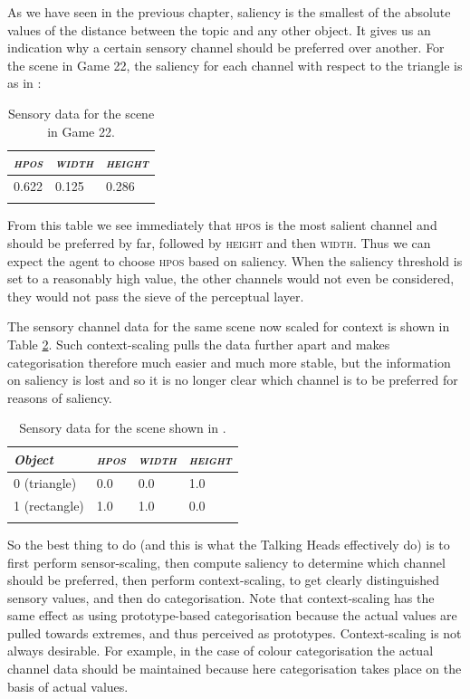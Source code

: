 As we have seen in the previous chapter, 
saliency is the smallest of the absolute values     
of the distance between the topic and any
other object. It gives us an indication why 
a certain sensory channel should be preferred
over another. For the scene in Game 22, the saliency for each channel with 
respect to the triangle is as in : 

\begin{table}
\begin{center}
\begin{tabular}{ l  l  l }
\lsptoprule
{\itshape \textsc{hpos}} & {\itshape \textsc{width}} & {\itshape \textsc{height}} \\ \midrule
 0.622 & 0.125 & 0.286  \\ 
\lspbottomrule
\end{tabular}
\caption{\label{tab:t-game22-sal}Sensory data for the scene in Game 22.}
\end{center}
\end{table}
From this table we see immediately that \textsc{hpos} is the 
most salient channel and should be preferred by far, followed
by \textsc{height} and then \textsc{width}. Thus we can expect the
agent to choose \textsc{hpos} based on saliency. When the saliency threshold
is set to a reasonably high value, the other channels
would not even be considered, they would not pass the 
sieve of the perceptual layer. 

The sensory channel data for the 
same scene now scaled for context is shown in Table \ref{tab:t-game22scaled}. Such context-scaling 
pulls the data further apart and makes categorisation 
therefore much easier and much more 
stable, but the information on saliency is lost and so 
it is no longer clear which channel is to be preferred
for reasons of saliency. 

\begin{table}
\begin{center}
\begin{tabular}{ l  l  l  l }
\lsptoprule
{\itshape Object} & {\itshape \textsc{hpos}} & {\itshape \textsc{width}} & {\itshape \textsc{height}} \\ \midrule
0 (triangle) & 0.0 & 0.0 & 1.0  \\ 
1 (rectangle) & 1.0 & 1.0 & 0.0 \\  
\lspbottomrule
\end{tabular}
\caption{\label{tab:t-game22scaled}Sensory data for the scene shown in .}
\end{center}
\end{table}
So the best thing to do (and this is what the Talking Heads 
effectively do) is to first perform sensor-scaling, then 
compute saliency to determine which channel should be 
preferred, then perform context-scaling, to get clearly 
distinguished sensory values, and then do categorisation. 
Note that context-scaling has the same effect as using 
prototype-based categorisation because the actual values 
are pulled towards extremes, and thus perceived as 
prototypes. Context-scaling is not always desirable. For example, 
in the case of colour categorisation the actual channel
data should be maintained because here categorisation 
takes place on the basis of actual values. 

